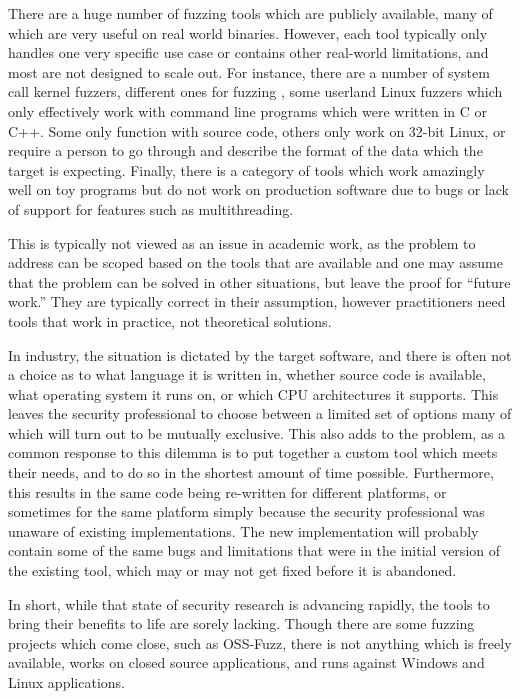 There are a huge number of fuzzing tools which are publicly available, many of
which are very useful on real world binaries.  However, each tool
typically only handles one very specific use case or contains other real-world limitations, and most are not designed to scale
out.  For instance, there are a number of system call kernel fuzzers, different ones for
fuzzing \IOCTLs{}, some userland Linux fuzzers which only effectively work with
command line programs which were written in C or C++.  Some only function with
source code, others only work on 32-bit Linux, or require a person to go
through and describe the format of the data which the target is
expecting.  Finally, there is a category of tools which work amazingly well
on toy programs but do not work on production software due to bugs or lack of
support for features such as multithreading.

This is typically not viewed as an issue in academic work, as the problem to address can be
scoped based on the tools that are available and one may assume that the problem can
be solved in other situations, but leave the proof for ``future work.''  They
are typically correct in their assumption, however practitioners need tools
that work in practice, not theoretical solutions.

In industry, the situation is dictated by the target software,
and there is often not a choice as to what language it is
written in, whether source code is available, what operating system it runs
on, or which CPU architectures it supports. This leaves the security
professional to choose between a limited set of options many of which will
turn out to be mutually exclusive. This also adds to the problem, as a common
response to this dilemma is to put together a custom tool which meets their
needs, and to do so in the shortest amount of time possible.  Furthermore,
this results in the same code being re-written for different platforms, or
sometimes for the same platform simply because the security professional was
unaware of existing implementations.  The new implementation will probably
contain some of the same bugs and limitations that were in the initial
version of the existing tool, which may or may not get fixed before it is
abandoned.

In short, while that state of security research is advancing rapidly, the
tools to bring their benefits to life are sorely lacking.  Though there are some
fuzzing projects which come close, such as OSS-Fuzz,\cite{ossfuzz} there
is not anything which is freely available, works on closed source applications,
and runs against Windows and Linux applications.
